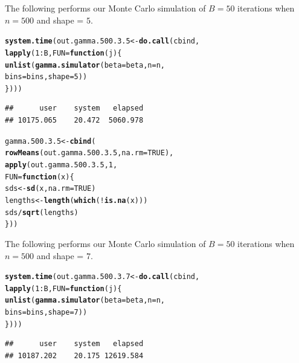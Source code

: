 \documentclass[11pt]{article}\usepackage[]{graphicx}\usepackage[]{color}
\makeatletter
\newcommand{\hlnum}[1]{\textcolor[rgb]{0.686,0.059,0.569}{#1}}%
\newcommand{\hlopt}[1]{\textcolor[rgb]{0,0,0}{#1}}%
\newcommand{\hlstd}[1]{\textcolor[rgb]{0.345,0.345,0.345}{#1}}%
\newcommand{\hlkwa}[1]{\textcolor[rgb]{0.161,0.373,0.58}{\textbf{#1}}}%
\newcommand{\hlkwb}[1]{\textcolor[rgb]{0.69,0.353,0.396}{#1}}%
\newcommand{\hlkwc}[1]{\textcolor[rgb]{0.333,0.667,0.333}{#1}}%
\newcommand{\hlkwd}[1]{\textcolor[rgb]{0.737,0.353,0.396}{\textbf{#1}}}%
\newenvironment{kframe}{%
 \def\at@end@of@kframe{}%
 \ifinner\ifhmode%
  \def\at@end@of@kframe{\end{minipage}}%
  \begin{minipage}{\columnwidth}%
 \fi\fi%
 \def\FrameCommand##1{\hskip\@totalleftmargin \hskip-\fboxsep
 \colorbox{shadecolor}{##1}\hskip-\fboxsep
     \hskip-\linewidth \hskip-\@totalleftmargin \hskip\columnwidth}%
 \MakeFramed {\advance\hsize-\width
   \@totalleftmargin\z@ \linewidth\hsize
   \@setminipage}}%
 {\par\unskip\endMakeFramed%
 \at@end@of@kframe}
\newenvironment{knitrout}{}{} %
\makeatother
\begin{document}
The following performs our Monte Carlo simulation of $B = 50$ iterations 
when $n = 500$ and shape = $5$.

\begin{knitrout}
\color{fgcolor}\begin{kframe}
\begin{alltt}
\hlkwd{system.time}\hlstd{(out.gamma.500.3.5} \hlkwb{<-} \hlkwd{do.call}\hlstd{(cbind,}
  \hlkwd{lapply}\hlstd{(}\hlnum{1}\hlopt{:}\hlstd{B,} \hlkwc{FUN} \hlstd{=} \hlkwa{function}\hlstd{(}\hlkwc{j}\hlstd{)\{}
    \hlkwd{unlist}\hlstd{(}\hlkwd{gamma.simulator}\hlstd{(}\hlkwc{beta} \hlstd{= beta,} \hlkwc{n} \hlstd{= n,}
      \hlkwc{bins} \hlstd{= bins,} \hlkwc{shape} \hlstd{=} \hlnum{5}\hlstd{))}
\hlstd{\})))}
\end{alltt}
\begin{verbatim}
##      user    system   elapsed 
## 10175.065    20.472  5060.978
\end{verbatim}
\end{kframe}
\end{knitrout}

\begin{knitrout}
\color{fgcolor}\begin{kframe}
\begin{alltt}
\hlstd{gamma.500.3.5} \hlkwb{<-} \hlkwd{cbind}\hlstd{(}
  \hlkwd{rowMeans}\hlstd{(out.gamma.500.3.5,} \hlkwc{na.rm} \hlstd{=} \hlnum{TRUE}\hlstd{),}
  \hlkwd{apply}\hlstd{(out.gamma.500.3.5,} \hlnum{1}\hlstd{,}
  \hlkwc{FUN} \hlstd{=} \hlkwa{function}\hlstd{(}\hlkwc{x}\hlstd{)\{}
    \hlstd{sds} \hlkwb{<-} \hlkwd{sd}\hlstd{(x,} \hlkwc{na.rm} \hlstd{=} \hlnum{TRUE}\hlstd{)}
    \hlstd{lengths} \hlkwb{<-} \hlkwd{length}\hlstd{(}\hlkwd{which}\hlstd{(}\hlopt{!}\hlkwd{is.na}\hlstd{(x)))}
    \hlstd{sds} \hlopt{/} \hlkwd{sqrt}\hlstd{(lengths)}
  \hlstd{\}))}
\end{alltt}
\end{kframe}
\end{knitrout}

The following performs our Monte Carlo simulation of $B = 50$ iterations 
when $n = 500$ and shape = $7$.

\begin{knitrout}
\color{fgcolor}\begin{kframe}
\begin{alltt}
\hlkwd{system.time}\hlstd{(out.gamma.500.3.7} \hlkwb{<-} \hlkwd{do.call}\hlstd{(cbind,}
  \hlkwd{lapply}\hlstd{(}\hlnum{1}\hlopt{:}\hlstd{B,} \hlkwc{FUN} \hlstd{=} \hlkwa{function}\hlstd{(}\hlkwc{j}\hlstd{)\{}
    \hlkwd{unlist}\hlstd{(}\hlkwd{gamma.simulator}\hlstd{(}\hlkwc{beta} \hlstd{= beta,} \hlkwc{n} \hlstd{= n,}
      \hlkwc{bins} \hlstd{= bins,} \hlkwc{shape} \hlstd{=} \hlnum{7}\hlstd{))}
\hlstd{\})))}
\end{alltt}
\begin{verbatim}
##      user    system   elapsed 
## 10187.202    20.175 12619.584
\end{verbatim}
\end{kframe}
\end{knitrout}
\end{document}
